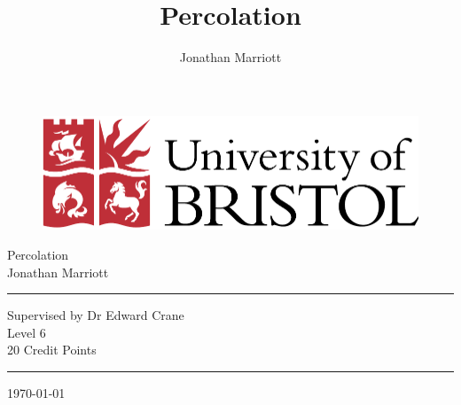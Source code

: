 \documentclass[a4paper,11pt]{article}
\theoremstyle{definition}
\begin{document}
\thispagestyle{empty}

\begin{figure}[h]
\begin{center}
\includegraphics[scale=0.5]{uob.pdf} %
\end{center}
\end{figure}

\begin{center}
{\Large Percolation\\ \vspace{1cm}Jonathan Marriott}
\end{center}

\vspace{3cm}
\hrule
\begin{center}
Supervised by Dr Edward Crane\\
Level 6\\
20 Credit Points
\end{center}
\hrule

\vspace{3cm}
\begin{center}
\today
\end{center}
	
\title{Percolation}
\author{Jonathan Marriott}
\date{}
\maketitle


\tableofcontents{}
\end{document}
